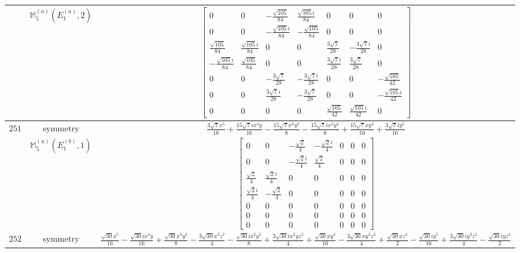 \documentclass[fleqn,8pt,landscape]{jsarticle}
\begin{document}
\begin{longtable}{ccc}
$  $ & $ \mathbb{M}_{5}^{(a)}(E_{1}^{(a)},2) $ & $ \begin{bmatrix} 0 & 0 & - \frac{\sqrt{105}}{84} & \frac{\sqrt{105} i}{84} & 0 & 0 & 0 \\ 0 & 0 & - \frac{\sqrt{105} i}{84} & - \frac{\sqrt{105}}{84} & 0 & 0 & 0 \\ \frac{\sqrt{105}}{84} & \frac{\sqrt{105} i}{84} & 0 & 0 & \frac{3 \sqrt{7}}{28} & - \frac{3 \sqrt{7} i}{28} & 0 \\ - \frac{\sqrt{105} i}{84} & \frac{\sqrt{105}}{84} & 0 & 0 & \frac{3 \sqrt{7} i}{28} & \frac{3 \sqrt{7}}{28} & 0 \\ 0 & 0 & - \frac{3 \sqrt{7}}{28} & - \frac{3 \sqrt{7} i}{28} & 0 & 0 & - \frac{\sqrt{105}}{42} \\ 0 & 0 & \frac{3 \sqrt{7} i}{28} & - \frac{3 \sqrt{7}}{28} & 0 & 0 & - \frac{\sqrt{105} i}{42} \\ 0 & 0 & 0 & 0 & \frac{\sqrt{105}}{42} & \frac{\sqrt{105} i}{42} & 0 \end{bmatrix} $ \\ \hline
$ 251 $ & $ \text{symmetry} $ & $ \frac{3 \sqrt{7} x^{5}}{16} + \frac{15 \sqrt{7} i x^{4} y}{16} - \frac{15 \sqrt{7} x^{3} y^{2}}{8} - \frac{15 \sqrt{7} i x^{2} y^{3}}{8} + \frac{15 \sqrt{7} x y^{4}}{16} + \frac{3 \sqrt{7} i y^{5}}{16} $ \\
$  $ & $ \mathbb{M}_{5}^{(a)}(E_{1}^{(b)},1) $ & $ \begin{bmatrix} 0 & 0 & - \frac{\sqrt{2}}{4} & - \frac{\sqrt{2} i}{4} & 0 & 0 & 0 \\ 0 & 0 & - \frac{\sqrt{2} i}{4} & \frac{\sqrt{2}}{4} & 0 & 0 & 0 \\ \frac{\sqrt{2}}{4} & \frac{\sqrt{2} i}{4} & 0 & 0 & 0 & 0 & 0 \\ \frac{\sqrt{2} i}{4} & - \frac{\sqrt{2}}{4} & 0 & 0 & 0 & 0 & 0 \\ 0 & 0 & 0 & 0 & 0 & 0 & 0 \\ 0 & 0 & 0 & 0 & 0 & 0 & 0 \\ 0 & 0 & 0 & 0 & 0 & 0 & 0 \end{bmatrix} $ \\ \hline
$ 252 $ & $ \text{symmetry} $ & $ \frac{\sqrt{30} x^{5}}{16} - \frac{\sqrt{30} i x^{4} y}{16} + \frac{\sqrt{30} x^{3} y^{2}}{8} - \frac{3 \sqrt{30} x^{3} z^{2}}{4} - \frac{\sqrt{30} i x^{2} y^{3}}{8} + \frac{3 \sqrt{30} i x^{2} y z^{2}}{4} + \frac{\sqrt{30} x y^{4}}{16} - \frac{3 \sqrt{30} x y^{2} z^{2}}{4} + \frac{\sqrt{30} x z^{4}}{2} - \frac{\sqrt{30} i y^{5}}{16} + \frac{3 \sqrt{30} i y^{3} z^{2}}{4} - \frac{\sqrt{30} i y z^{4}}{2} $ \\

\end{longtable}
\end{document}
